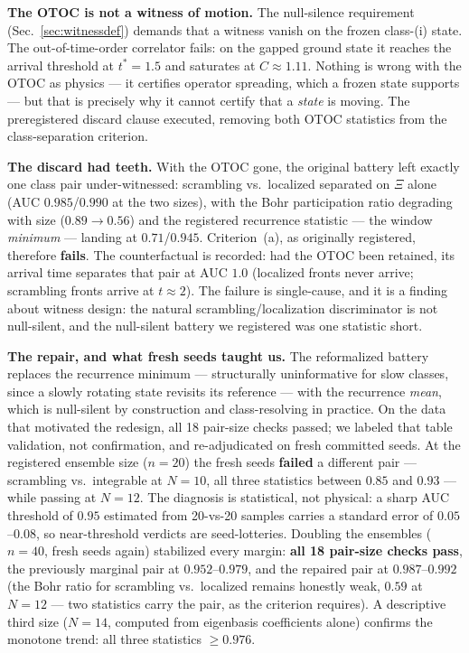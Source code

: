 \documentclass[a4paper,11pt,noarxiv]{quantumarticle}
\begin{document}
\textbf{The OTOC is not a witness of motion.} The null-silence
requirement (Sec.~\ref{sec:witnessdef}) demands that a witness vanish
on the frozen class-(i) state. The out-of-time-order correlator fails:
on the gapped ground state it reaches the arrival threshold at
$t^*=1.5$ and saturates at $C \approx 1.11$. Nothing is wrong with the
OTOC as physics --- it certifies operator spreading, which a frozen
state supports --- but that is precisely why it cannot certify that a
\emph{state} is moving. The preregistered discard clause executed,
removing both OTOC statistics from the class-separation criterion.

\textbf{The discard had teeth.} With the OTOC gone, the original
battery left exactly one class pair under-witnessed: scrambling vs.\
localized separated on $\Xi$ alone (AUC $0.985$/$0.990$ at the two
sizes), with the Bohr participation ratio degrading with size ($0.89
\to 0.56$) and the registered recurrence statistic --- the window
\emph{minimum} --- landing at $0.71$/$0.945$. Criterion~(a), as
originally registered, therefore \textbf{fails}. The counterfactual is
recorded: had the OTOC been retained, its arrival time separates that
pair at AUC $1.0$ (localized fronts never arrive; scrambling fronts
arrive at $t \approx 2$). The failure is single-cause, and it is a
finding about witness design: the natural scrambling/localization
discriminator is not null-silent, and the null-silent battery we
registered was one statistic short.

\textbf{The repair, and what fresh seeds taught us.} The reformalized
battery replaces the recurrence minimum --- structurally uninformative
for slow classes, since a slowly rotating state revisits its reference
--- with the recurrence \emph{mean}, which is null-silent by
construction and class-resolving in practice. On the data that
motivated the redesign, all 18 pair-size checks passed; we labeled that
table validation, not confirmation, and re-adjudicated on fresh
committed seeds. At the registered ensemble size ($n=20$) the fresh
seeds \textbf{failed} a different pair --- scrambling vs.\ integrable
at $N=10$, all three statistics between $0.85$ and $0.93$ --- while
passing at $N=12$. The diagnosis is statistical, not physical: a sharp
AUC threshold of $0.95$ estimated from 20-vs-20 samples carries a
standard error of $0.05$--$0.08$, so near-threshold verdicts are
seed-lotteries. Doubling the ensembles ($n=40$, fresh seeds again)
stabilized every margin: \textbf{all 18 pair-size checks pass}, the
previously marginal pair at $0.952$--$0.979$, and the repaired pair at
$0.987$--$0.992$ (the Bohr ratio for scrambling vs.\ localized remains
honestly weak, $0.59$ at $N=12$ --- two statistics carry the pair, as
the criterion requires). A descriptive third size ($N=14$, computed
from eigenbasis coefficients alone) confirms the monotone trend: all
three statistics $\geq 0.976$.
\end{document}
